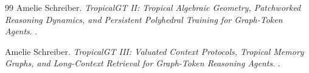 \documentclass[11pt]{article}
\theoremstyle{definition}
\theoremstyle{remark}
\numberwithin{equation}{section}
\begin{document}
\begin{thebibliography}{99}
Amelie Schreiber.
\newblock \emph{TropicalGT II: Tropical Algebraic Geometry, Patchworked Reasoning Dynamics, and Persistent Polyhedral Training for Graph-Token Agents}.
.

Amelie Schreiber.
\newblock \emph{TropicalGT III: Valuated Context Protocols, Tropical Memory Graphs, and Long-Context Retrieval for Graph-Token Reasoning Agents}.
.

\end{thebibliography}
\end{document}
